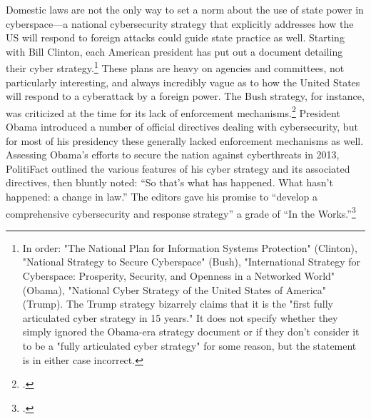 \documentclass{memoir}
\begin{document}
\begin{refsegment}
Domestic laws are not the only way to set a norm about the use of state power in cyberspace---a national cybersecurity strategy that explicitly addresses how the US will respond to foreign attacks could guide state practice as well. Starting with Bill Clinton, each American president has put out a document detailing their cyber strategy.\footnote{In order: "The National Plan for Information Systems Protection" (Clinton), "National Strategy to Secure Cyberspace" (Bush), "International Strategy for Cyberspace: Prosperity, Security, and Openness in a Networked World" (Obama), "National Cyber Strategy of the United States of America" (Trump). The Trump strategy bizarrely claims that it is the "first fully articulated cyber strategy in 15 years." It does not specify whether they simply ignored the Obama-era strategy document or if they don't consider it to be a "fully articulated cyber strategy" for some reason, but the statement is in either case incorrect.} These plans are heavy on agencies and committees, not particularly interesting, and always incredibly vague as to how the United States will respond to a cyberattack by a foreign power. The Bush strategy, for instance, was criticized at the time for its lack of enforcement mechanisms.\footcite{lemos_bush_2003} President Obama introduced a number of official directives dealing with cybersecurity, but for most of his presidency these generally lacked enforcement mechanisms as well. Assessing Obama's efforts to secure the nation against cyberthreats in 2013, PolitiFact outlined the various features of his cyber strategy and its associated directives, then bluntly noted: ``So that's what has happened. What hasn't happened: a change in law.'' The editors gave his promise to ``develop a comprehensive cybersecurity and response strategy'' a grade of ``In the Works.''\footcite{moorhead_work_2013}



\end{refsegment}
\end{document}
